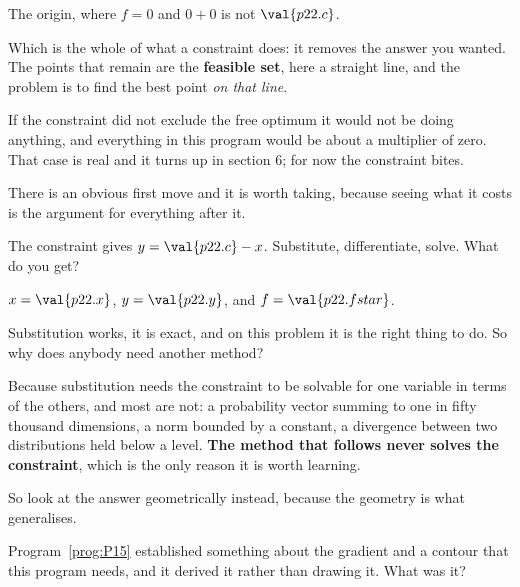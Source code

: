 \begin{fr}
\begin{ansblock}
The origin, where $f = 0$ \dash{} and $0 + 0$ is not $\val{p22.c}$.
\end{ansblock}

Which is the whole of what a constraint does: it removes the answer you
wanted. The points that remain are the \textbf{feasible set}, here a straight
line, and the problem is to find the best point \emph{on that line}.

\begin{note}
If the constraint did not exclude the free optimum it would not be doing
anything, and everything in this program would be about a multiplier of zero.
That case is real and it turns up in section 6; for now the constraint bites.
\end{note}
\end{fr}

\begin{fr}
There is an obvious first move and it is worth taking, because seeing what it
costs is the argument for everything after it.

The constraint gives $y = \val{p22.c} - x$. Substitute, differentiate, solve.
What do you get?
\nextframe
\end{fr}

\begin{fr}
\begin{ansblock}
$x = \val{p22.x}$, $y = \val{p22.y}$, and $f = \val{p22.fstar}$.
\end{ansblock}

Substitution works, it is exact, and on this problem it is the right thing to
do. So why does anybody need another method?

Because substitution needs the constraint to be solvable for one variable in
terms of the others, and most are not: a probability vector summing to one in
fifty thousand dimensions, a norm bounded by a constant, a divergence between
two distributions held below a level. \textbf{The method that follows never
solves the constraint}, which is the only reason it is worth learning.
\end{fr}

\begin{fr}
So look at the answer geometrically instead, because the geometry is what
generalises.

Program~\ref{prog:P15} established something about the gradient and a contour
that this program needs, and it derived it rather than drawing it. What was
it?
\dotline
\nextframe
\end{fr}

